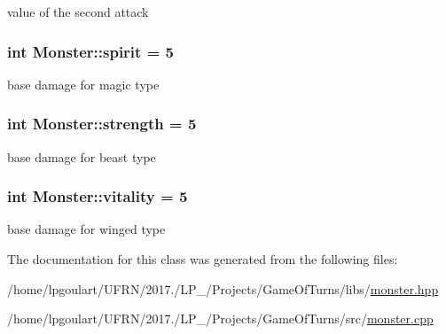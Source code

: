 value of the second attack 

\subsubsection[{\texorpdfstring{spirit}{spirit}}]{\setlength{\rightskip}{0pt plus 5cm}int Monster\+::spirit = 5\hspace{0.3cm}{\ttfamily [protected]}}\hypertarget{classMonster_aa1b8da71fd1003628cee59bb8f52f270}{}\label{classMonster_aa1b8da71fd1003628cee59bb8f52f270}


base damage for magic type 

\subsubsection[{\texorpdfstring{strength}{strength}}]{\setlength{\rightskip}{0pt plus 5cm}int Monster\+::strength = 5\hspace{0.3cm}{\ttfamily [protected]}}\hypertarget{classMonster_afbc16b4a4bf61323209aea1b5a49e696}{}\label{classMonster_afbc16b4a4bf61323209aea1b5a49e696}


base damage for beast type 

\subsubsection[{\texorpdfstring{vitality}{vitality}}]{\setlength{\rightskip}{0pt plus 5cm}int Monster\+::vitality = 5\hspace{0.3cm}{\ttfamily [protected]}}\hypertarget{classMonster_a30645db1b638fc2c158720519c0bf645}{}\label{classMonster_a30645db1b638fc2c158720519c0bf645}


base damage for winged type 



The documentation for this class was generated from the following files\+:\begin{DoxyCompactItemize}
\item 
/home/lpgoulart/\+U\+F\+R\+N/2017./\+L\+P\+\_/\+Projects/\+Game\+Of\+Turns/libs/\hyperlink{monster_8hpp}{monster.\+hpp}\item 
/home/lpgoulart/\+U\+F\+R\+N/2017./\+L\+P\+\_/\+Projects/\+Game\+Of\+Turns/src/\hyperlink{monster_8cpp}{monster.\+cpp}\end{DoxyCompactItemize}
